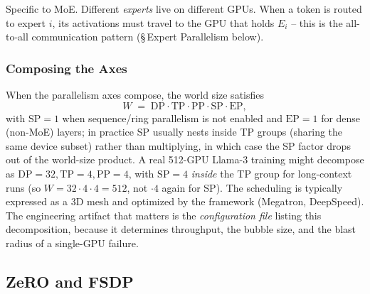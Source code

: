 Specific to MoE. Different \emph{experts} live on different GPUs.
When a token is routed to expert $i$, its activations must travel to
the GPU that holds $E_i$ -- this is the all-to-all communication
pattern (\S\,Expert Parallelism below).

\subsubsection{Composing the Axes}

When the parallelism axes compose, the world size satisfies
\begin{equation*}
W \;=\; \mathrm{DP} \cdot \mathrm{TP} \cdot \mathrm{PP} \cdot
        \mathrm{SP} \cdot \mathrm{EP},
\end{equation*}
with $\mathrm{SP} = 1$ when sequence/ring parallelism is not
enabled and $\mathrm{EP} = 1$ for dense (non-MoE) layers; in
practice SP usually nests inside TP groups (sharing the same
device subset) rather than multiplying, in which case the SP factor
drops out of the world-size product. A real 512-GPU Llama-3
training might decompose as $\mathrm{DP}=32, \mathrm{TP}=4,
\mathrm{PP}=4$, with $\mathrm{SP}=4$ \emph{inside} the TP group for
long-context runs (so $W = 32 \cdot 4 \cdot 4 = 512$, not
$\cdot 4$ again for SP). The scheduling is typically expressed as
a 3D mesh and optimized by the framework (Megatron, DeepSpeed). The
engineering artifact that matters is the \emph{configuration file}
listing this decomposition, because it determines throughput, the
bubble size, and the blast radius of a single-GPU failure.

\subsection{ZeRO and FSDP}

